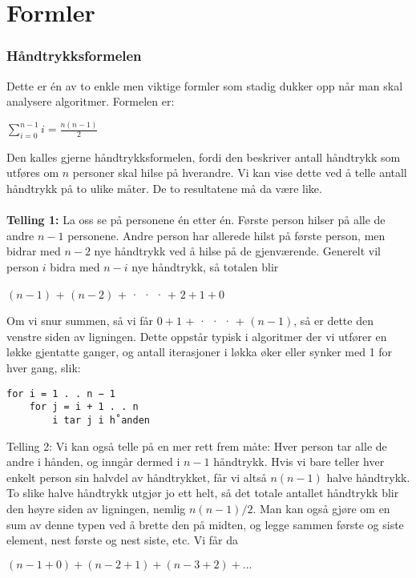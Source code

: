 \section{Formler}
\subsubsection{Håndtrykksformelen}
Dette er én av to enkle men viktige formler som stadig dukker opp når man skal
analysere algoritmer. Formelen er:
\begin{center}
$\sum\limits_{i=0}^{n-1} i = \frac{n(n-1)}{2}$
\end{center}

\noindent Den kalles gjerne håndtrykksformelen, fordi den beskriver antall håndtrykk som
utføres om $n$ personer skal hilse på hverandre. Vi kan vise dette ved å telle antall
håndtrykk på to ulike måter. De to resultatene må da være like.
\\\\
\textbf{Telling 1:} La oss se på personene én etter én. Første person hilser på alle de
andre $n − 1$ personene. Andre person har allerede hilst på første person, men
bidrar med $n − 2$ nye håndtrykk ved å hilse på de gjenværende. Generelt vil
person $i$ bidra med $n − i$ nye håndtrykk, så totalen blir
\begin{center}
$(n − 1)$ + $(n − 2)$ + · · · + $2 + 1 + 0 $
\end{center}

\noindent Om vi snur summen, så vi får $0 + 1$ + · · · + $(n − 1)$, så er dette den venstre siden
av ligningen. Dette oppstår typisk i algoritmer der vi utfører en løkke gjentatte
ganger, og antall iterasjoner i løkka øker eller synker med 1 for hver gang, slik:

\begin{lstlisting}
for i = 1 . . n − 1
    for j = i + 1 . . n
        i tar j i h˚anden
\end{lstlisting}

\noindent Telling 2: Vi kan også telle på en mer rett frem måte: Hver person tar alle de
andre i hånden, og inngår dermed i $n − 1$ håndtrykk. Hvis vi bare teller hver
enkelt person sin halvdel av håndtrykket, får vi altså $n(n − 1)$ halve håndtrykk.
To slike halve håndtrykk utgjør jo ett helt, så det totale antallet håndtrykk blir
den høyre siden av ligningen, nemlig $n(n − 1)/2$.
Man kan også gjøre om en sum av denne typen ved å brette den på midten, og
legge sammen første og siste element, nest første og nest siste, etc. Vi får da
\begin{center}
$(n − 1 + 0) + (n − 2 + 1) + (n − 3 + 2) + . . .$
\end{center}

